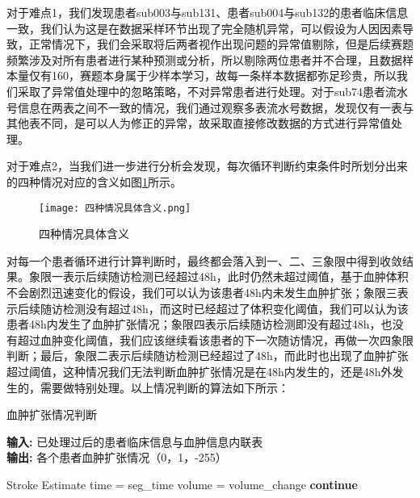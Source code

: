\documentclass[bwprint]{gmcmthesis}
\begin{document}
				对于难点1，我们发现患者sub003与sub131、患者sub004与sub132的患者临床信息一致，我们认为这是在数据采样环节出现了完全随机异常，可以假设为人因因素导致，正常情况下，我们会采取将后两者视作出现问题的异常值剔除，但是后续赛题频繁涉及对所有患者进行某种预测或分析，所以剔除两位患者并不合理，且数据样本量仅有160，赛题本身属于少样本学习，故每一条样本数据都弥足珍贵，所以我们采取了异常值处理中的忽略策略，不对异常患者进行处理。对于sub74患者流水号信息在两表之间不一致的情况，我们通过观察多表流水号数据，发现仅有一表与其他表不同，是可以人为修正的异常，故采取直接修改数据的方式进行异常值处理。
				
				对于难点2，当我们进一步进行分析会发现，每次循环判断约束条件时所划分出来的四种情况对应的含义如图\ref{fig:3}所示。
				
				\begin{figure}[H]
					\centering
					\texttt{[image: 四种情况具体含义.png]}
					\caption{四种情况具体含义}
					\label{fig:3}
				\end{figure}
				
				对每一个患者循环进行计算判断时，最终都会落入到一、二、三象限中得到收敛结果。象限一表示后续随访检测已经超过48h，此时仍然未超过阈值，基于血肿体积不会剧烈迅速变化的假设，我们可以认为该患者48h内未发生血肿扩张；象限三表示后续随访检测没有超过48h，而这时已经超过了体积变化阈值，我们可以认为该患者48h内发生了血肿扩张情况；象限四表示后续随访检测即没有超过48h，也没有超过血肿变化阈值，我们应该继续看该患者的下一次随访情况，再做一次四象限判断；最后，象限二表示后续随访检测已经超过了48h，而此时也出现了血肿扩张超过阈值，这种情况我们无法判断血肿扩张情况是在48h内发生的，还是48h外发生的，需要做特别处理。以上情况判断的算法如下所示：
				
				\begin{center}
					\begin{minipage}{0.8\textwidth}
						\begin{algorithm}[H]%
							\caption{血肿扩张情况判断} %
							{\bf 输入:} %
							已处理过后的患者临床信息与血肿信息内联表\\
							{\bf 输出:} %
							各个患者血肿扩张情况（0，1，-255）
							\begin{algorithmic}[1]
								\State Stroke Estimate
								\State time = seg\_time 
								\State volume = volume\_change
								\State {}
								\EndIf
								\State {}
								\EndIf
								\State {}
								\EndIf
								\State \textbf{continue}
								\EndIf
								\EndFor
							\end{algorithmic}
						\end{algorithm}
					\end{minipage}
				\end{center}
				
\end{document}

